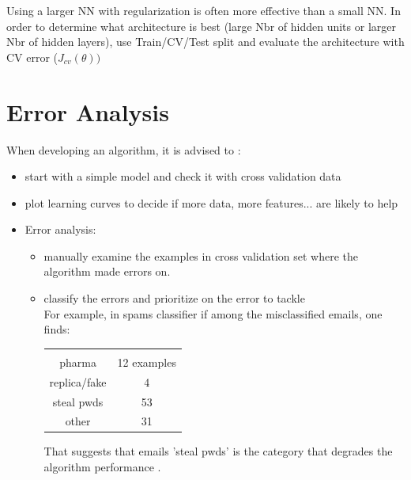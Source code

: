 \documentclass[a4paper,12pt]{report}
\begin{document}
Using a larger NN with regularization is often more effective than a small NN.
In order to determine what architecture is best (large Nbr of hidden units or larger Nbr of hidden layers), use Train/CV/Test split and evaluate the architecture with CV error ($J_{cv}(\theta))$


\section{Error Analysis}
When  developing an algorithm, it is advised to :
\begin{itemize}
\item start with a simple model and check it with cross validation data
\item plot learning curves to decide if more data, more features... are likely to help
\item Error analysis: 
	\begin{itemize}
		\item manually examine the examples in cross validation set where the algorithm made errors on.
		\item classify the errors and prioritize on the error to tackle \\
		For example, in spams classifier if among the misclassified emails, one finds:
	
		\begin{table}[!htbp]
		\centering
		\begin{tabular}[H]{|c|c|}
		  \hline \\
		  pharma & 12 examples \\
			\hline
			replica/fake & 4 \\
			\hline
			steal pwds & 53 \\
			\hline
			other & 31 \\
			\hline
		\end{tabular}
		\end{table}
		That suggests that emails 'steal pwds' is the category that degrades the algorithm performance . 
	\end{itemize}
\end{itemize}
\end{document}

